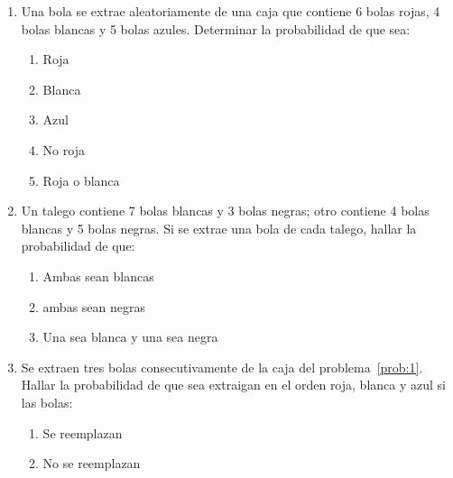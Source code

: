 \documentclass[fleqn]{article}
\begin{document}
 
\begin{enumerate}
	\item \label{prob:1} Una bola se extrae aleatoriamente de una caja que contiene 6 bolas rojas, 4 bolas blancas y 5 bolas azules. Determinar la probabilidad de que sea:
	\begin{enumerate}
	\item Roja \noanswer
	\item Blanca \noanswer
	\item Azul\noanswer
	\item No roja \noanswer
	\item Roja o blanca\noanswer
	\end{enumerate}
	\newpage
   \item Un talego contiene 7 bolas blancas y 3 bolas negras; otro contiene 4 bolas blancas y 5 bolas negras. Si se extrae una bola de cada talego, hallar la probabilidad de que:
      \begin{enumerate}
	 \item Ambas sean blancas\noanswer
	 \item ambas sean negras \noanswer
	 \item Una sea blanca y una sea negra\noanswer
      \end{enumerate}
   \item Se extraen tres bolas consecutivamente de la caja del problema~\ref{prob:1}. Hallar la probabilidad de que sea extraigan en el orden roja, blanca y azul si las bolas:
   \begin{enumerate}
   \item Se reemplazan\noanswer
   \item No se reemplazan\noanswer
   \end{enumerate}
   \end{enumerate}
\end{document}
